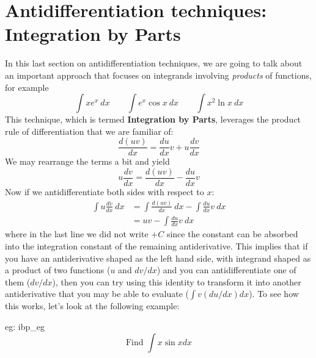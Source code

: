 \pagebreak
\section{Antidifferentiation techniques: Integration by Parts}
In this last section on antidifferentiation techniques, we are going to talk about an important approach that focuses on integrands involving \textit{products} of functions, for example
\[\int xe^x~dx \qquad \int e^x \cos x~dx \qquad \int x^2 \ln x~dx\]
This technique, which is termed \textbf{Integration by Parts}, leverages the product rule of differentiation that we are familiar of:
\[\frac{d(uv)}{dx} = \frac{du}{dx}v + u\frac{dv}{dx}\]
We may rearrange the terms a bit and yield
\[u\frac{dv}{dx} = \frac{d(uv)}{dx} - \frac{du}{dx}v\]
Now if we antidifferentiate both sides with respect to $x$:
\begin{align*}
    \int u\frac{dv}{dx}~dx &= \int\frac{d(uv)}{dx}~dx - \int \frac{du}{dx}v~dx\\
    &= uv - \int \frac{du}{dx}v~dx
\end{align*}
where in the last line we did not write $+C$ since the constant can be absorbed into the integration constant of the remaining antiderivative.  This implies that if you have an antiderivative shaped as the left hand side, with integrand shaped as a product of two functions ($u$ and $dv/dx$) and you can antidifferentiate one of them ($dv/dx$), then you can try using this identity to transform it into another antiderivative that you may be able to evaluate ($\int v (du/dx) dx$).  To see how this works, let's look at the following example:
\begin{eg}[]{eg: ibp_eg}
    \[\text{Find  }\int x\sin x dx\]
\end{eg}
